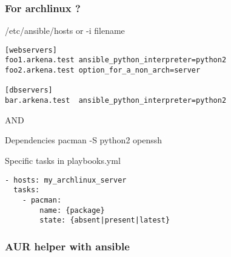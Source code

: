 \documentclass{beamer}
\begin{document}
\begin{frame}[fragile]
\frametitle{For archlinux ?}

    \begin{block}{/etc/ansible/hosts or -i filename}
        \begin{verbatim}
[webservers]
foo1.arkena.test ansible_python_interpreter=python2
foo2.arkena.test option_for_a_non_arch=server

[dbservers]
bar.arkena.test  ansible_python_interpreter=python2
        \end{verbatim}
    \end{block}
AND
    \begin{block}{Dependencies}
pacman -S python2 openssh
    \end{block}
\end{frame}

\begin{frame}[fragile]

    \begin{block}{Specific tasks in playbooks.yml}
        \begin{verbatim}
- hosts: my_archlinux_server
  tasks:
    - pacman:
        name: {package}
        state: {absent|present|latest}
\end{verbatim}
    \end{block}


\end{frame}

\begin{frame}
\frametitle{AUR helper with ansible}
    \begin{block}{}
        \tiny{
        \inputminted{yaml}{sources/aur_helper/tasks/main.yml}
        }
    \end{block}
\end{frame}
\end{document}
